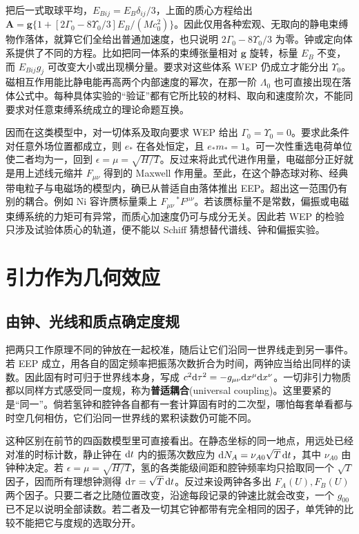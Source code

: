 把后一式取球平均，$E_{Bij}=E_B\delta_{ij}/3$，上面的质心方程给出 $\bm A=\bm g\{1+[2\Gamma_0-8\Upsilon_0/3]E_B/(Mc_0^2)\}$。因此仅用各种宏观、无取向的静电束缚物作落体，就算它们全给出普通加速度，也只说明 $2\Gamma_0-8\Upsilon_0/3$ 为零。钟或定向体系提供了不同的方程。比如把同一体系的束缚张量相对 $\bm g$ 旋转，标量 $E_B$ 不变，而 $E_{Bij}g_j$ 可改变大小或出现横分量。要求对这些体系 WEP 仍成立才能分出 $\Upsilon_0$。磁相互作用能比静电能再高两个内部速度的幂次，在那一阶 $\Lambda_0$ 也可直接出现在落体公式中。每种具体实验的“验证”都有它所比较的材料、取向和速度阶次，不能同要求对任意束缚系统成立的理论命题互换。

因而在这类模型中，对一切体系及取向要求 WEP 给出 $\Gamma_0=\Upsilon_0=0$。要求此条件对任意外场位置都成立，则 $e_*$ 在各处恒定，且 $e_*m_*=1$。可一次性重选电荷单位使二者均为一，回到 $\epsilon=\mu=\sqrt{H/T}$。反过来将此式代进作用量，电磁部分正好就是用上述线元缩并 $F_{\mu\nu}$ 得到的 Maxwell 作用量。至此，在这个静态球对称、经典带电粒子与电磁场的模型内，确已从普适自由落体推出 EEP。超出这一范围仍有别的耦合。例如 Ni 容许赝标量乘上 $F_{\mu\nu}\,{}^*F^{\mu\nu}$。若该赝标量不是常数，偏振或电磁束缚系统的力矩可有异常，而质心加速度仍可与成分无关。因此若 WEP 的检验只涉及试验体质心的轨道，便不能以 Schiff 猜想替代谱线、钟和偏振实验。

\section{引力作为几何效应}\label{sec:exp-geometric}

\subsection{由钟、光线和质点确定度规}

把两只工作原理不同的钟放在一起校准，随后让它们沿同一世界线走到另一事件。若 EEP 成立，用各自的固定频率把振荡次数折合为时间，两钟应当给出同样的读数。因此固有时可归于世界线本身，写成 $c^2\dd\tau^2=-g_{\mu\nu}\dd x^\mu\dd x^\nu$。一切非引力物质都以同样方式感受同一度规，称为\textbf{普适耦合}(universal coupling)。这里要紧的是“同一”。倘若氢钟和腔钟各自都有一套计算固有时的二次型，哪怕每套单看都与时空几何相仿，它们沿同一世界线的累积读数仍可能不同。

这种区别在前节的四函数模型里可直接看出。在静态坐标的同一地点，用远处已经对准的时标计数，静止钟在 $\dd t$ 内的振荡次数应为 $\dd N_A=\nu_{A0}\sqrt{T}\,\dd t$，其中 $\nu_{A0}$ 由钟种决定。若 $\epsilon=\mu=\sqrt{H/T}$，氢的各类能级间距和腔钟频率均只拾取同一个 $\sqrt T$ 因子，因而所有理想钟测得 $\dd\tau=\sqrt T\,\dd t$。反过来设两钟各多出 $F_A(U),F_B(U)$ 两个因子。只要二者之比随位置改变，沿途每段记录的钟速比就会改变，一个 $g_{00}$ 已不足以说明全部读数。若二者及一切其它钟都带有完全相同的因子，单凭钟的比较不能把它与度规的选取分开。

